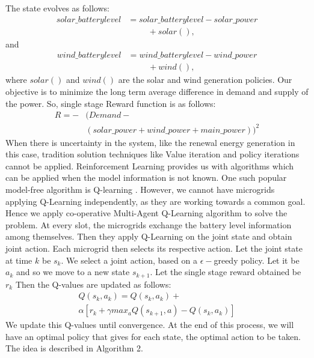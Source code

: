 \documentclass[conference]{IEEEtran}
\begin{document}
The state evolves as follows:
\begin{equation}
\begin{split}
solar\_batterylevel &= solar\_batterylevel - solar\_power \\&\hspace{1cm}+ solar(), 
\end{split}
\end{equation}
and
\begin{equation}
\begin{split}
wind\_batterylevel &= wind\_batterylevel - wind\_power 
\\&\hspace{1cm}  + wind(),
\end{split}
\end{equation}
where
$solar()$ and $wind()$ are the solar and wind generation policies. 
Our objective is to minimize the long term average difference in demand and supply of the power. So, single stage Reward function is as follows:
\begin{equation}
\begin{split}
R = -&(Demand - \\
&(solar\_power+wind\_power+main\_power))^2
\end{split}
\end{equation}
When there is uncertainty in the system, like the renewal energy generation in this case, tradition solution techniques like Value iteration and policy iterations cannot be applied. Reinforcement Learning provides us with algorithms which can be applied when the model information is not known. One such popular model-free algorithm is Q-learning \cite{vol2}. However, we cannot have microgrids applying Q-Learning independently, as they are working towards a common goal. Hence we apply co-operative Multi-Agent Q-Learning algorithm \cite{marl} to solve the problem. At every slot, the microgrids exchange the battery level information among themselves. Then they apply Q-Learning on the joint state and obtain joint action. Each microgrid then selects its respective action. Let the joint state at time $k$ be $s_{k}$. We select a joint action, based on a $\epsilon-$greedy policy. Let it be $a_{k}$ and so we move to a new state $s_{k+1}$. Let the single stage reward obtained be $r_{k}$ Then the Q-values are updated as follows:
\begin{equation}\label{Q-val}
\begin{split}
Q(s_{k},a_{k}) = Q(s_{k},a_{k}) + \\
 \alpha[r_{k}+\gamma max_{a}Q(s_{k+1},a) - Q(s_{k},a_{k})] 
\end{split}
\end{equation}
We update this Q-values until convergence. At the end of this process, we will have an optimal policy that gives for each state, the optimal action to be taken. The idea is described in  Algorithm 2. 
\end{document}
